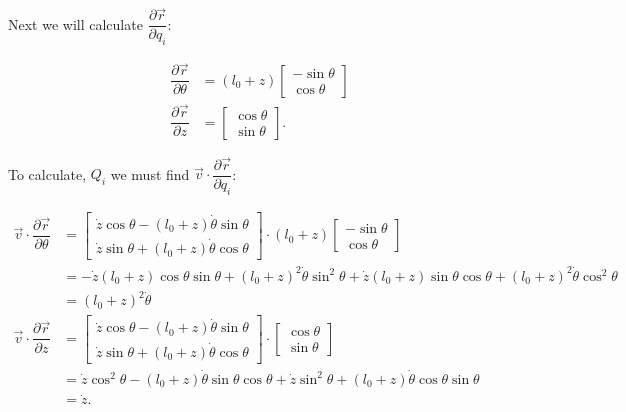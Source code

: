 \documentclass[12pt,a4paper,portrait]{article}
\begin{document}
Next we will calculate $\dfrac{\partial \vec{r}}{\partial q_i}$:

\begin{align*}
	\dfrac{\partial \vec{r}}{\partial \theta} &= (l_0+z)\begin{bmatrix}
		-\sin{\theta} \\
		\cos{\theta}
	\end{bmatrix} \\
	\dfrac{\partial \vec{r}}{\partial z} &= \begin{bmatrix}
		\cos{\theta} \\
		\sin{\theta}
	\end{bmatrix}.
\end{align*}

To calculate, $Q_i$ we must find $\vec{v} \cdot \dfrac{\partial \vec{r}}{\partial q_i}$:

\begin{align*}
	\vec{v} \cdot \dfrac{\partial \vec{r}}{\partial \theta} &= \begin{bmatrix}
		\dot{z}\cos{\theta} - (l_0+z)\dot{\theta}\sin{\theta} \\
		\dot{z}\sin{\theta} + (l_0+z)\dot{\theta}\cos{\theta}
	\end{bmatrix} \cdot (l_0+z)\begin{bmatrix}
		-\sin{\theta} \\
		\cos{\theta}
	\end{bmatrix} \\
	&= -\dot{z}(l_0+z)\cos{\theta} \sin{\theta} + (l_0+z)^2 \dot{\theta}\sin^2{\theta} + \dot{z}(l_0+z)\sin{\theta} \cos{\theta} +(l_0+z)^2\dot{\theta}\cos^2{\theta} \\
	&= (l_0+z)^2 \dot{\theta} \\
	\vec{v} \cdot \dfrac{\partial \vec{r}}{\partial z} &= \begin{bmatrix}
		\dot{z}\cos{\theta} - (l_0+z)\dot{\theta}\sin{\theta} \\
		\dot{z}\sin{\theta} + (l_0+z)\dot{\theta}\cos{\theta}
	\end{bmatrix} \cdot \begin{bmatrix}
		\cos{\theta} \\
		\sin{\theta}
	\end{bmatrix} \\
	&= \dot{z}\cos^2{\theta} - (l_0+z)\dot{\theta} \sin{\theta}\cos{\theta} + \dot{z}\sin^2{\theta} + (l_0+z)\dot{\theta}\cos{\theta}\sin{\theta} \\
	&= \dot{z}. 
\end{align*}
\end{document}
